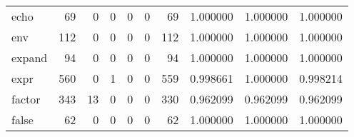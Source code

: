 \begin{longtable}{lrrrrrrrrr}
echo      &                                    69 &                                                  0 &                                                  0 &                                                  0 &                                                  0 &                                                 69 &                                           1.000000 &                               1.000000 &                             1.000000 \\
env       &                                   112 &                                                  0 &                                                  0 &                                                  0 &                                                  0 &                                                112 &                                           1.000000 &                               1.000000 &                             1.000000 \\
expand    &                                    94 &                                                  0 &                                                  0 &                                                  0 &                                                  0 &                                                 94 &                                           1.000000 &                               1.000000 &                             1.000000 \\
expr      &                                   560 &                                                  0 &                                                  1 &                                                  0 &                                                  0 &                                                559 &                                           0.998661 &                               1.000000 &                             0.998214 \\
factor    &                                   343 &                                                 13 &                                                  0 &                                                  0 &                                                  0 &                                                330 &                                           0.962099 &                               0.962099 &                             0.962099 \\
false     &                                    62 &                                                  0 &                                                  0 &                                                  0 &                                                  0 &                                                 62 &                                           1.000000 &                               1.000000 &                             1.000000 \\

\end{longtable}
